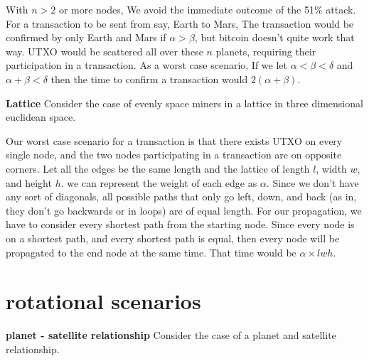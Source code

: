 \documentclass[conference]{IEEEtran}
\begin{document}
With $n > 2$ or more nodes, We avoid the immediate outcome of the 51\% attack. For a transaction to be sent from say, Earth to Mars, The transaction would be confirmed by only Earth and Mars if $\alpha > \beta$, but bitcoin doesn't quite work that way. UTXO would be scattered all over these $n$ planets, requiring their participation in a transaction. As a worst case scenario, If we let $\alpha < \beta < \delta$ and $\alpha + \beta < \delta$ then the  time to confirm a transaction would $2(\alpha + \beta)$.

\textbf{Lattice} Consider the case of evenly space miners in a lattice in three dimensional euclidean space. 
\begin{center}
\end{center}
Our worst case scenario for a transaction is that there exists UTXO on every single node, and the two nodes participating in a transaction are on opposite corners. Let all the edges be the same length and the lattice of length $l$, width $w$, and height $h$. we can represent the weight of each edge as $\alpha$. Since we don't have any sort of diagonals, all possible paths that only go left, down, and back (as in, they don't go backwards or in loops) are of equal length. For our propagation, we have to consider every shortest path from the starting node. Since every node is on a shortest path, and every shortest path is equal, then every node will be propagated to the end node at the same time. That time would be $\alpha \times lwh$.

\section{rotational scenarios}
\textbf{planet - satellite relationship}
Consider the case of a planet and satellite relationship.
\end{document}
